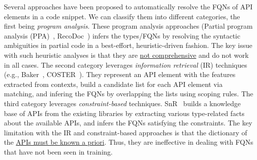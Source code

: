 Several approaches have been proposed to automatically resolve the
FQNs of API elements in a code snippet. We can
classify them into different categories, the first being {\em program
  analysis}. These program analysis approaches (Partial program
analysis (PPA)~\cite{dagenais-oopsla08},
RecoDoc~\cite{dagenais-icse12}) infers the types/FQNs by resolving the
syntactic ambiguities in partial code in a best-effort,
heuristic-driven fashion. The key issue with such heuristic analyses
is that they are \underline{not comprehensive} and do not work in all
cases. The second category leverages {\em information retrieval} (IR)
techniques (e.g., Baker~\cite{liveapi14}, COSTER~\cite{coster-ase19}).
They represent an API element with the features extracted from
contexts, build a candidate list for each API element via matching,
and infering the FQNs by overlapping the lists using scoping rules.
The third category leverages {\em constraint-based}
techniques. SnR~\cite{snr-icse22} builds a knowledge base of
APIs from the existing libraries by extracting various type-related
facts about the available APIs, and infers the FQNs satisfying
the constraints. The key limitation with the IR and constraint-based
approaches is that the dictionary of the \underline{APIs must be known
  a priori}. Thus, they are ineffective in dealing with FQNs that have
not been seen in training.


